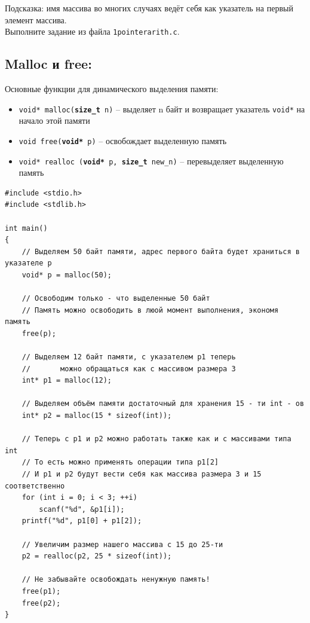 \documentclass{article}
\begin{document}
Подсказка: имя массива во многих случаях ведёт себя как указатель на первый элемент массива. \\
Выполните задание из файла \texttt{1pointerarith.c}.

\subsection*{Malloc и free:}
Основные функции для динамического выделения памяти:
\begin{itemize}
\item \texttt{void* malloc(\textbf{size\_t} n)} -- выделяет n байт и возвращает указатель \texttt{void*}
на начало этой памяти \\
\item \texttt{void free(\textbf{void*} p)} -- освобождает выделенную память\\
\item \texttt{void* realloc (\textbf{void*} p, \textbf{size\_t} new\_n)} -- перевыделяет выделенную память\\
\end{itemize}
\begin{lstlisting}
#include <stdio.h>
#include <stdlib.h>

int main()
{
	// Выделяем 50 байт памяти, адрес первого байта будет храниться в указателе p
	void* p = malloc(50); 
	
	// Освободим только - что выделенные 50 байт
	// Память можно освободить в люой момент выполнения, экономя память
	free(p);              

	// Выделяем 12 байт памяти, с указателем p1 теперь
	//       можно обращаться как с массивом размера 3
	int* p1 = malloc(12); 
    
	// Выделяем объём памяти достаточный для хранения 15 - ти int - ов
	int* p2 = malloc(15 * sizeof(int)); 

	// Теперь с p1 и p2 можно работать также как и с массивами типа int
	// То есть можно применять операции типа p1[2]
	// И p1 и p2 будут вести себя как массива размера 3 и 15 соответственно
	for (int i = 0; i < 3; ++i)
		scanf("%d", &p1[i]);
	printf("%d", p1[0] + p1[2]);
	
	// Увеличим размер нашего массива с 15 до 25-ти
	p2 = realloc(p2, 25 * sizeof(int)); 
	
	// Не забывайте освобождать ненужную память!
	free(p1);
	free(p2);
}
\end{lstlisting}
\end{document}
